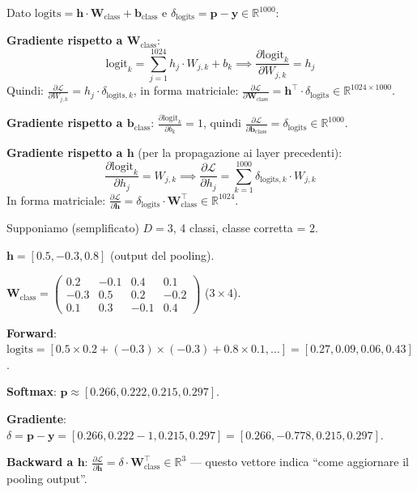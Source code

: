 \documentclass[12pt,a4paper]{article}
\begin{document}
\begin{proofbox}
Dato $\text{logits} = \mathbf{h} \cdot \mathbf{W}_{\text{class}} + \mathbf{b}_{\text{class}}$ e $\delta_{\text{logits}} = \mathbf{p} - \mathbf{y} \in \mathbb{R}^{1000}$:

\textbf{Gradiente rispetto a $\mathbf{W}_{\text{class}}$}:
\[
    \text{logit}_k = \sum_{j=1}^{1024} h_j \cdot W_{j,k} + b_k \implies \frac{\partial \text{logit}_k}{\partial W_{j,k}} = h_j
\]
Quindi: $\frac{\partial \mathcal{L}}{\partial W_{j,k}} = h_j \cdot \delta_{\text{logits},k}$, in forma matriciale: $\frac{\partial \mathcal{L}}{\partial \mathbf{W}_{\text{class}}} = \mathbf{h}^\top \cdot \delta_{\text{logits}} \in \mathbb{R}^{1024 \times 1000}$.

\textbf{Gradiente rispetto a $\mathbf{b}_{\text{class}}$}: $\frac{\partial \text{logit}_k}{\partial b_k} = 1$, quindi $\frac{\partial \mathcal{L}}{\partial \mathbf{b}_{\text{class}}} = \delta_{\text{logits}} \in \mathbb{R}^{1000}$.

\textbf{Gradiente rispetto a $\mathbf{h}$} (per la propagazione ai layer precedenti):
\[
    \frac{\partial \text{logit}_k}{\partial h_j} = W_{j,k} \implies \frac{\partial \mathcal{L}}{\partial h_j} = \sum_{k=1}^{1000} \delta_{\text{logits},k} \cdot W_{j,k}
\]
In forma matriciale: $\frac{\partial \mathcal{L}}{\partial \mathbf{h}} = \delta_{\text{logits}} \cdot \mathbf{W}_{\text{class}}^\top \in \mathbb{R}^{1024}$.
\end{proofbox}

\begin{examplebox}
Supponiamo (semplificato) $D = 3$, 4 classi, classe corretta = 2.

$\mathbf{h} = [0.5, -0.3, 0.8]$ (output del pooling).

$\mathbf{W}_{\text{class}} = \begin{pmatrix} 0.2 & -0.1 & 0.4 & 0.1 \\ -0.3 & 0.5 & 0.2 & -0.2 \\ 0.1 & 0.3 & -0.1 & 0.4 \end{pmatrix}$ ($3 \times 4$).

\textbf{Forward}: $\text{logits} = [0.5 \times 0.2 + (-0.3) \times (-0.3) + 0.8 \times 0.1, \ldots] = [0.27, 0.09, 0.06, 0.43]$.

\textbf{Softmax}: $\mathbf{p} \approx [0.266, 0.222, 0.215, 0.297]$.

\textbf{Gradiente}: $\delta = \mathbf{p} - \mathbf{y} = [0.266, 0.222 - 1, 0.215, 0.297] = [0.266, -0.778, 0.215, 0.297]$.

\textbf{Backward a $\mathbf{h}$}: $\frac{\partial \mathcal{L}}{\partial \mathbf{h}} = \delta \cdot \mathbf{W}_{\text{class}}^\top \in \mathbb{R}^{3}$ --- questo vettore indica ``come aggiornare il pooling output''.
\end{examplebox}
\end{document}
